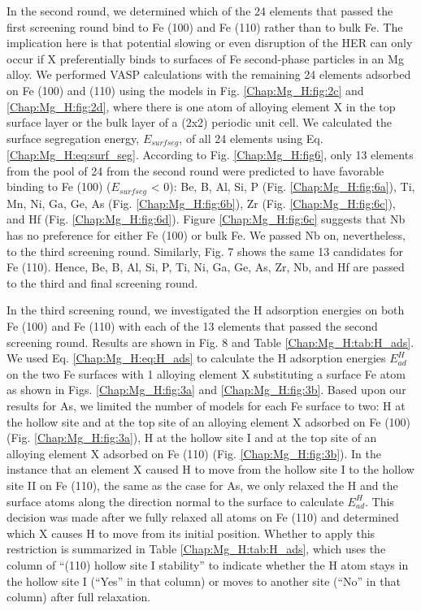 In the second round, we determined which of the 24 elements that passed the first screening round bind to Fe (100) and Fe (110) rather than to bulk Fe. The implication here is that potential slowing or even disruption of the HER can only occur if X preferentially binds to surfaces of Fe second-phase particles in an Mg alloy. We performed \ac{VASP} calculations with the remaining 24 elements adsorbed on Fe (100) and (110) using the models in Fig. \ref{Chap:Mg_H:fig:2c} and \ref{Chap:Mg_H:fig:2d}, where there is one atom of alloying element X in the top surface layer or the bulk layer of a (2x2) periodic unit cell. We calculated the surface segregation energy, $E_{surf seg}$, of all 24 elements using Eq. \ref{Chap:Mg_H:eq:surf_seg}. According to Fig. \ref{Chap:Mg_H:fig6}, only 13 elements from the pool of 24 from the second round were predicted to have favorable binding to Fe (100) ($E_{surf seg}$ < 0): Be, B, Al, Si, P (Fig. \ref{Chap:Mg_H:fig:6a}), Ti, Mn, Ni, Ga, Ge, As (Fig. \ref{Chap:Mg_H:fig:6b}), Zr (Fig. \ref{Chap:Mg_H:fig:6c}), and Hf (Fig. \ref{Chap:Mg_H:fig:6d}). Figure \ref{Chap:Mg_H:fig:6c} suggests that Nb has no preference for either Fe (100) or bulk Fe. We passed Nb on, nevertheless, to the third screening round. Similarly, Fig. 7 shows the same 13 candidates for Fe (110).  Hence, Be, B, Al, Si, P, Ti, Ni, Ga, Ge, As, Zr, Nb, and Hf are passed to the third and final screening round.



In the third screening round, we investigated the H adsorption energies on both Fe (100) and Fe (110) with each of the 13 elements that passed the second screening round. Results are shown in Fig. 8 and Table \ref{Chap:Mg_H:tab:H_ads}. We used Eq. \ref{Chap:Mg_H:eq:H_ads} to calculate the H adsorption energies $E_{ad}^H$ on the two Fe surfaces with 1 alloying element X substituting a surface Fe atom as shown in Figs. \ref{Chap:Mg_H:fig:3a} and \ref{Chap:Mg_H:fig:3b}. Based upon our results for As, we limited the number of models for each Fe surface to two: H at the hollow site and at the top site of an alloying element X adsorbed on Fe (100) (Fig. \ref{Chap:Mg_H:fig:3a}), H at the hollow site I and at the top site of an alloying element X adsorbed on Fe (110) (Fig. \ref{Chap:Mg_H:fig:3b}). In the instance that an element X caused H to move from the hollow site I to the hollow site II on Fe (110), the same as the case for As, we only relaxed the H and the surface atoms along the direction normal to the surface to calculate $E_{ad}^H$. This decision was made after we fully relaxed all atoms on Fe (110) and determined which X causes H to move from its initial position. Whether to apply this restriction is summarized in Table \ref{Chap:Mg_H:tab:H_ads}, which uses the column of “(110) hollow site I stability” to indicate whether the H atom stays in the hollow site I (“Yes” in that column) or moves to another site (“No” in that column) after full relaxation.


